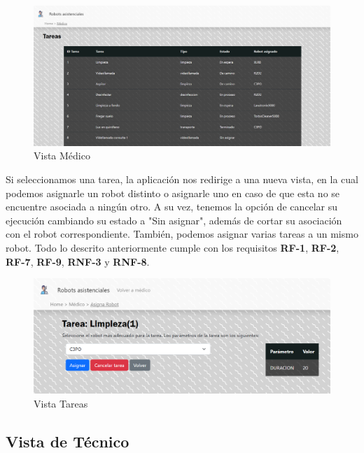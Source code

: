 \begin{figure}[H]
	\centering
	\includegraphics[width=1\textwidth]{images/VistaMedico.png}
	\caption{Vista Médico}
	\label{fig:UMLModel}
\end{figure}

Si seleccionamos una tarea, la aplicación nos redirige a una nueva vista, en la cual podemos asignarle un robot distinto o asignarle uno en caso de que esta no se encuentre asociada a ningún otro. A su vez, tenemos la opción de cancelar su ejecución cambiando su estado a "Sin asignar", además de cortar su asociación con el robot correspondiente. También, podemos asignar varias tareas a un mismo robot. Todo lo descrito anteriormente cumple con los requisitos \textbf{RF-1}, \textbf{RF-2}, \textbf{RF-7}, \textbf{RF-9}, \textbf{RNF-3} y \textbf{RNF-8}.

\begin{figure}[H]
	\centering
	\includegraphics[width=1\textwidth]{images/VistaTarea.png}
	\caption{Vista Tareas}
	\label{fig:UMLModel}
\end{figure}

\subsection{Vista de Técnico}

